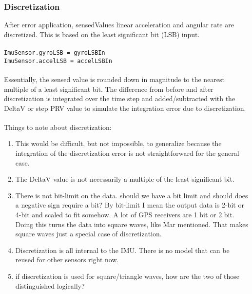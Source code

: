 \documentclass[]{BasiliskReportMemo}
\begin{document}
\subsubsection{Discretization}
After error application, sensedValues linear acceleration and angular rate are discretized. This is based on the least significant bit (LSB) input.\\\\
\verb|ImuSensor.gyroLSB = gyroLSBIn|\\
\verb|ImuSensor.accelLSB = accelLSBIn|\\\\
 Essentially, the sensed value is rounded down in magnitude to the nearest multiple of a least significant bit. The difference from before and after discretization is integrated over the time step and added/subtracted with the DeltaV or step PRV value to simulate the integration error due to discretization.\\\\
Things to note about discretization:
\begin{enumerate}
	\item This would be difficult, but not impossible, to generalize because the integration of the discretization error is not straightforward for the general case.
	\item The DeltaV value is not necessarily a multiple of the least significant bit.
	\item There is not bit-limit on the data. should we have a bit limit and should does a negative sign require a bit? By bit-limit I mean the output data is 2-bit or 4-bit and scaled to fit somehow. A lot of GPS receivers are 1 bit or 2 bit. Doing this turns the data into square waves, like Mar mentioned. That makes square waves just a special case of discretization.
	\item Discretization is all internal to the IMU. There is no model that can be reused for other sensors right now.
	\item if discretization is used for square/triangle waves, how are the two of those distinguished logically?
\end{enumerate}
\end{document}
